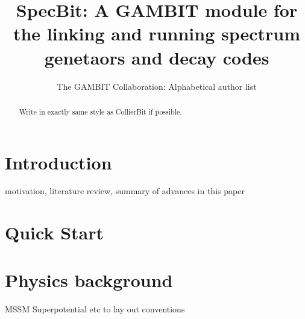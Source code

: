 \documentclass[11pt,a4paper]{article}
\title{SpecBit: A GAMBIT module for the linking and running spectrum genetaors and decay codes}
\author{The GAMBIT Collaboration: Alphabetical author list} %
\begin{document}
\maketitle

\begin{abstract}
Write in exactly same style as CollierBit if possible.
\end{abstract}

\tableofcontents


\section{Introduction}
motivation, literature review, summary of advances in this paper



\section{Quick Start}

\section{Physics background}
MSSM Superpotential etc to lay out conventions
\end{document}
